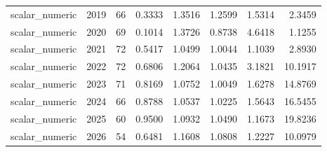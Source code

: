 \begin{tabular}{lrrrrrrr}
scalar_numeric & 2019 & 66 & 0.3333 & 1.3516 & 1.2599 & 1.5314 & 2.3459 \\
scalar_numeric & 2020 & 69 & 0.1014 & 1.3726 & 0.8738 & 4.6418 & 1.1255 \\
scalar_numeric & 2021 & 72 & 0.5417 & 1.0499 & 1.0044 & 1.1039 & 2.8930 \\
scalar_numeric & 2022 & 72 & 0.6806 & 1.2064 & 1.0435 & 3.1821 & 10.1917 \\
scalar_numeric & 2023 & 71 & 0.8169 & 1.0752 & 1.0049 & 1.6278 & 14.8769 \\
scalar_numeric & 2024 & 66 & 0.8788 & 1.0537 & 1.0225 & 1.5643 & 16.5455 \\
scalar_numeric & 2025 & 60 & 0.9500 & 1.0932 & 1.0490 & 1.1673 & 19.8236 \\
scalar_numeric & 2026 & 54 & 0.6481 & 1.1608 & 1.0808 & 1.2227 & 10.0979 \\
\bottomrule
\end{tabular}
